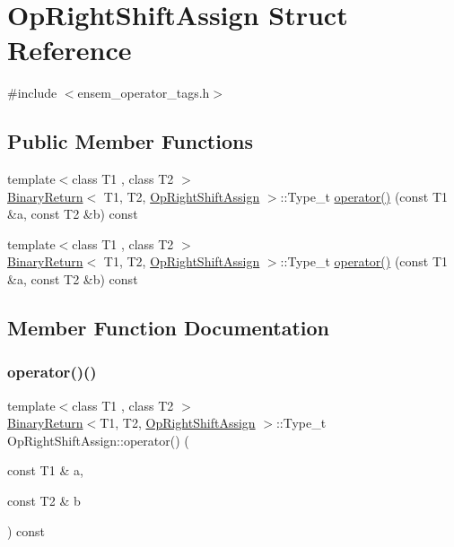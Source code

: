 \hypertarget{structOpRightShiftAssign}{}\section{Op\+Right\+Shift\+Assign Struct Reference}
\label{structOpRightShiftAssign}


{\ttfamily \#include $<$ensem\+\_\+operator\+\_\+tags.\+h$>$}

\subsection*{Public Member Functions}
\begin{DoxyCompactItemize}
\item 
{\footnotesize template$<$class T1 , class T2 $>$ }\\\mbox{\hyperlink{structBinaryReturn}{Binary\+Return}}$<$ T1, T2, \mbox{\hyperlink{structOpRightShiftAssign}{Op\+Right\+Shift\+Assign}} $>$\+::Type\+\_\+t \mbox{\hyperlink{structOpRightShiftAssign_aadcc045ee32dcfceb41c254bec68ef3c}{operator()}} (const T1 \&a, const T2 \&b) const
\item 
{\footnotesize template$<$class T1 , class T2 $>$ }\\\mbox{\hyperlink{structBinaryReturn}{Binary\+Return}}$<$ T1, T2, \mbox{\hyperlink{structOpRightShiftAssign}{Op\+Right\+Shift\+Assign}} $>$\+::Type\+\_\+t \mbox{\hyperlink{structOpRightShiftAssign_aadcc045ee32dcfceb41c254bec68ef3c}{operator()}} (const T1 \&a, const T2 \&b) const
\end{DoxyCompactItemize}


\subsection{Member Function Documentation}
\mbox{\label{structOpRightShiftAssign_aadcc045ee32dcfceb41c254bec68ef3c}} 
\subsubsection{\texorpdfstring{operator()()}{operator()()}\hspace{0.1cm}{\footnotesize\ttfamily [1/2]}}
{\footnotesize\ttfamily template$<$class T1 , class T2 $>$ \\
\mbox{\hyperlink{structBinaryReturn}{Binary\+Return}}$<$T1, T2, \mbox{\hyperlink{structOpRightShiftAssign}{Op\+Right\+Shift\+Assign}} $>$\+::Type\+\_\+t Op\+Right\+Shift\+Assign\+::operator() (\begin{DoxyParamCaption}\item[{const T1 \&}]{a,  }\item[{const T2 \&}]{b }\end{DoxyParamCaption}) const\hspace{0.3cm}{\ttfamily [inline]}}


